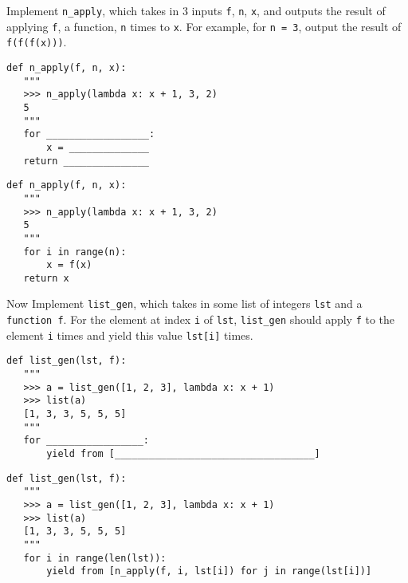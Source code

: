 \begin{blocksection}
\question Implement \texttt{n\_apply}, which takes in 3 inputs \texttt{f}, \texttt{n}, \texttt{x}, and outputs the result of applying \texttt{f}, a function, \texttt{n} times to \texttt{x}. For example, for \texttt{n = 3}, output the result of \texttt{f(f(f(x)))}. 

\begin{lstlisting}
def n_apply(f, n, x):
   """
   >>> n_apply(lambda x: x + 1, 3, 2)
   5
   """
   for __________________:
       x = ______________
   return _______________
\end{lstlisting}

\begin{solution}[0.7in]
\begin{lstlisting}
def n_apply(f, n, x):
   """
   >>> n_apply(lambda x: x + 1, 3, 2)
   5
   """
   for i in range(n):
       x = f(x)
   return x
\end{lstlisting}
\end{solution}

\question Now Implement \texttt{list\_gen}, which takes in some list of integers \texttt{lst} and a \texttt{function f}. For the element at index \texttt{i} of \texttt{lst}, \texttt{list\_gen} should apply \texttt{f} to the element \texttt{i} times and yield this value \texttt{lst[i]} times.


\begin{lstlisting}
def list_gen(lst, f):
   """
   >>> a = list_gen([1, 2, 3], lambda x: x + 1)
   >>> list(a)
   [1, 3, 3, 5, 5, 5]
   """
   for _________________:
       yield from [___________________________________]
\end{lstlisting}

\begin{solution}[0.7in]
\begin{lstlisting}
def list_gen(lst, f):
   """
   >>> a = list_gen([1, 2, 3], lambda x: x + 1)
   >>> list(a)
   [1, 3, 3, 5, 5, 5]
   """
   for i in range(len(lst)):
       yield from [n_apply(f, i, lst[i]) for j in range(lst[i])]
\end{lstlisting}
\end{solution}
\end{blocksection}

